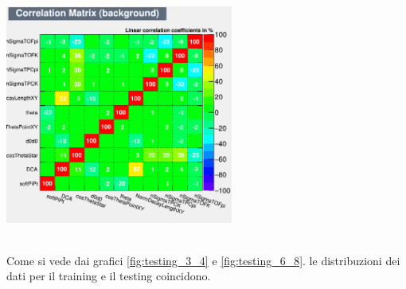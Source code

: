     \begin{minipage}{0.5\textwidth}
        \begin{flushright} \large
        \includegraphics[width=7.5cm]{training&testing/CorrelationMatrixB.png}
        \label{fig:testing_6_8}
        \end{flushright}
    \end{minipage} \\[1.cm]
    
Come si vede dai grafici \ref{fig:testing_3_4} e \ref{fig:testing_6_8}. le distribuzioni dei dati per il training e il testing coincidono.